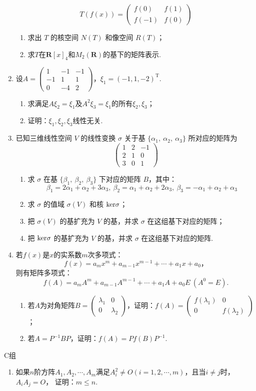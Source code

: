 \begin{enumerate}
    \[T(f(x))=\begin{pmatrix}f(0) & f(1) \\ f(-1) & f(0)\end{pmatrix}\]
	\begin{enumerate}[label=(\arabic*)]
        \item 求出 $T$ 的核空间 $N(T)$ 和像空间 $R(T)$；
        \item 求$T$在$\mathbf{R}[x]_4$和$M_2(\mathbf{R})$的基下的矩阵表示.
    \end{enumerate}
    \item 设$A=\begin{pmatrix}
		1 & -1 & -1 \\ -1 & 1 & 1 \\ 0 & -4 & 2
	\end{pmatrix}$，$\xi_1=(-1,1,-2)^\mathrm{T}$.
    \begin{enumerate}
        \item 求满足$A\xi_2=\xi_1$及$A^2\xi_3=\xi_1$的所有$\xi_2,\xi_3$；
        \item 证明：$\xi_1,\xi_2,\xi_3$线性无关.
    \end{enumerate}
    \item 已知三维线性空间 $V$ 的线性变换 $\sigma$ 关于基 $\{\alpha_1,\ \alpha_2,\ \alpha_3\}$ 所对应的矩阵为
    \[\begin{pmatrix}1 & 2 & -1 \\ 2 & 1 & 0 \\ 3 & 0 & 1\end{pmatrix}\]
	\begin{enumerate}[label=(\arabic*)]
        \item 求 $\sigma$ 在基 $\{\beta_1,\ \beta_2,\ \beta_3\}$ 下对应的矩阵 $B$，其中：
		\[\beta_1=2\alpha_1+\alpha_2+3\alpha_3,\ \beta_2=\alpha_1+\alpha_2+2\alpha_3,\ \beta_3=-\alpha_1+\alpha_2+\alpha_3\]
        \item 求 $\sigma$ 的值域 $\sigma(V)$ 和核 $\textup{ker}\sigma$；
        \item 把 $\sigma(V)$ 的基扩充为 $V$ 的基，并求 $\sigma$ 在这组基下对应的矩阵；
        \item 把 $\textup{ker}\sigma$ 的基扩充为 $V$ 的基，并求 $\sigma$ 在这组基下对应的矩阵.
    \end{enumerate}
    \item 若$f(x)$是$x$的实系数$m$次多项式：
	\[f(x)=a_mx^m+a_{m-1}x^{m-1}+\cdots+a_1x+a_0，\]
	则有矩阵多项式：
	\[f(A)=a_mA^m+a_{m-1}A^{m-1}+\cdots+a_1A+a_0E\ (A^0=E).\]
    \begin{enumerate}[label=(\arabic*)]
        \item 若$A$为对角矩阵$B=\begin{pmatrix}
            \lambda_1 & 0 \\ 0 & \lambda_2
        \end{pmatrix}$，证明：$f(A)=\begin{pmatrix}
            f(\lambda_1) & 0 \\ 0 & f(\lambda_2)
        \end{pmatrix}$；
        \item 若$A=P^{-1}BP$，证明：$f(A)=Pf(B)P^{-1}$.
    \end{enumerate}
\end{enumerate}
\centerline{\heiti C组}
\begin{enumerate}
    \item 如果$n$阶方阵$A_1,A_2,\cdots,A_m$满足$A_i^2\neq O(i=1,2,\cdots,m)$，且当$i\neq j$时，$A_iA_j=O$，
	证明：$m\le n$.
\end{enumerate}
